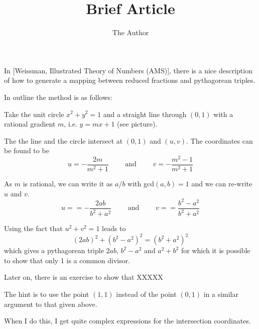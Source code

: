 \documentclass[11pt]{amsart}
\title{Brief Article}
\author{The Author}
\begin{document}


In [Weissman, Illustrated Theory of Numbers (AMS)], there is a nice description of how to generate a mapping between reduced fractions and pythagorean triples.

In outline the method is as follows:

Take the unit circle $x^2+y^2=1$ and a straight line through $(0,1)$ with a rational gradient $m$, i.e. $y = mx + 1$ (see picture).

The the line  and the circle intersect at $(0,1)$ and $(u,v)$. The coordinates can be found to be 
$$
u = -\frac{2 m}{{{m}^{2}}+1} \qquad 
\text{ and }
\qquad
v = -\frac{{{m}^{2}}-1}{{{m}^{2}}+1}
$$

As $m$ is rational, we can write it as $a/b$ with gcd$(a,b)=1$ and we can re-write $u$ and $v$.
$$
u = =-\frac{2 a b}{{{b}^{2}}+{{a}^{2}}}
\qquad 
\text{ and }
\qquad
v = =\frac{{{b}^{2}}-{{a}^{2}}}{{{b}^{2}}+{{a}^{2}}}
$$

Using the fact that $u^2+v^2 = 1$ leads to
$$
(2ab)^2 + (b^2-a^2)^2 = (b^2 + a^2)^2
$$
which gives a pythagorean triple $2ab$, $b^2-a^2$ and $a^2+b^2$ for which it is possible to show that only 1 is a common divisor.

Later on, there is an exercise to show that XXXXX

The hint is to use the point $(1,1)$ instead of the point $(0,1)$ in a similar argument to that given above.

When I do this, I get quite complex expressions for the intersection coordinates.

\newpage
\end{document}
